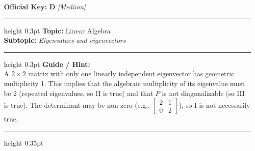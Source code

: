 \documentclass[a4paper,10pt]{article}
\begin{document}
\begin{tcolorbox}
\textbf{Official Key:} \textbf{\large D} \hfill \textit{\small [Medium]}
\vspace{2pt}\hrule height 0.3pt\vspace{3pt}
\textbf{Topic:} Linear Algebra \\
\textbf{Subtopic:} \textit{Eigenvalues and eigenvectors}
\vspace{2pt}\hrule height 0.3pt\vspace{3pt}
\textbf{Guide / Hint:} \\
{\small A $2 \times 2$ matrix with only one linearly independent eigenvector has geometric multiplicity 1. This implies that the algebraic multiplicity of its eigenvalue must be 2 (repeated eigenvalues, so II is true) and that $P$ is not diagonalizable (so III is true). The determinant may be non-zero (e.g., $\begin{bmatrix} 2 & 1 \\ 0 & 2 \end{bmatrix}$), so I is not necessarily true.}

\end{tcolorbox}
\vspace{6pt}\hrule height 0.35pt\vspace{6pt}
\noindent
\end{document}
